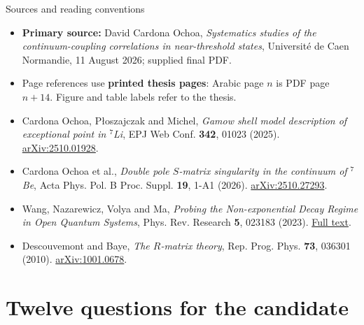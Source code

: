\documentclass[aspectratio=169,11pt]{beamer}
\begin{document}
\begin{frame}{Sources and reading conventions}
\small
\begin{itemize}\setlength\itemsep{1.5mm}
\item \textbf{Primary source:} David Cardona Ochoa, \emph{Systematics studies of the continuum-coupling correlations in near-threshold states}, Universit\'e de Caen Normandie, 11 August 2026; supplied final PDF.
\item Page references use \textbf{printed thesis pages}: Arabic page $n$ is PDF page $n+14$. Figure and table labels refer to the thesis.
\item Cardona Ochoa, P\l{}oszajczak and Michel, \emph{Gamow shell model description of exceptional point in $^7$Li}, EPJ Web Conf. \textbf{342}, 01023 (2025). \href{https://arxiv.org/abs/2510.01928}{arXiv:2510.01928}.
\item Cardona Ochoa et al., \emph{Double pole $S$-matrix singularity in the continuum of $^7$Be}, Acta Phys. Pol. B Proc. Suppl. \textbf{19}, 1-A1 (2026). \href{https://arxiv.org/abs/2510.27293}{arXiv:2510.27293}.
\item Wang, Nazarewicz, Volya and Ma, \emph{Probing the Non-exponential Decay Regime in Open Quantum Systems}, Phys. Rev. Research \textbf{5}, 023183 (2023). \href{https://arxiv.org/html/2211.11619}{Full text}.
\item Descouvemont and Baye, \emph{The $R$-matrix theory}, Rep. Prog. Phys. \textbf{73}, 036301 (2010). \href{https://arxiv.org/abs/1001.0678}{arXiv:1001.0678}.
\end{itemize}
\end{frame}

\section{Twelve questions for the candidate}
\end{document}
